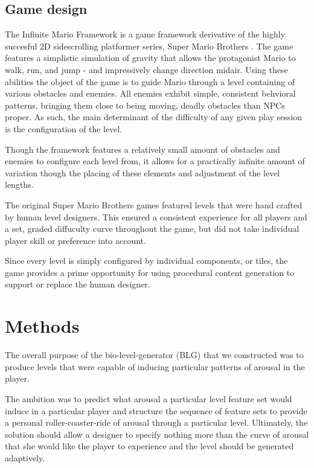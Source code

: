 \documentclass{llncs}
\begin{document}
\subsection{Game design}
The Infinite Mario Framework is a game framework derivative of the highly succesful 2D sidescrolling platformer series, Super Mario Brothers \cite{marioai}.
The game features a simplistic simulation of gravity that allows the protagonist Mario to walk, run, and jump - and impressively change direction midair.
Using these abilities the object of the game is to guide Mario through a level containing of various obstacles and enemies. All enemies exhibit simple, consistent behvioral patterns, bringing them close to being moving, deadly obstacles than NPCs proper. As such, the main determinant of the difficulty of any given play session is the configuration of the level.

Though the framework features a relatively small amount of obstacles and enemies to configure each level from, it allows for a practically infinite amount of variation though the placing of these elements and adjustment of the level lengths.

The original Super Mario Brothers games featured levels that were hand crafted by human level designers. This ensured a consistent experience for all players and a set, graded diffuculty curve throughout the game, but did not take individual player skill or preference into account.

Since every level is simply configured by individual components, or tiles, the game provides a prime opportunity for using procedural content generation to support or replace the human designer.

\section{Methods}
The overall purpose of the bio-level-generator (BLG) that we constructed was to produce levels that were capable of inducing particular patterns of arousal in the player.

The ambition was to predict what arousal a particular level feature set would induce in a particular player and structure the sequence of feature sets to provide a personal roller-coaster-ride of arousal through a particular level.
Ultimately, the solution should allow a designer to specify nothing more than the curve of arousal that she would like the player to experience and the level should be generated adaptively.
\end{document}
